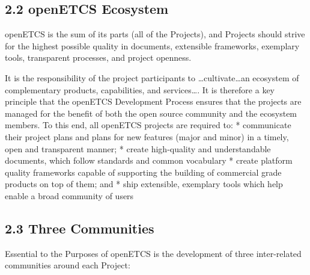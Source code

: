 \subsection{2.2 openETCS Ecosystem}\label{openetcs-ecosystem}

openETCS is the sum of its parts (all of the Projects), and Projects
should strive for the highest possible quality in documents, extensible
frameworks, exemplary tools, transparent processes, and project
openness.

It is the responsibility of the project participants to
\ldots{}cultivate\ldots{}an ecosystem of complementary products,
capabilities, and services\ldots{}. It is therefore a key principle that
the openETCS Development Process ensures that the projects are managed
for the benefit of both the open source community and the ecosystem
members. To this end, all openETCS projects are required to: *
communicate their project plans and plans for new features (major and
minor) in a timely, open and transparent manner; * create high-quality
and understandable documents, which follow standards and common
vocabulary * create platform quality frameworks capable of supporting
the building of commercial grade products on top of them; and * ship
extensible, exemplary tools which help enable a broad community of users

\subsection{2.3 Three Communities}\label{three-communities}

Essential to the Purposes of openETCS is the development of three
inter-related communities around each Project:

